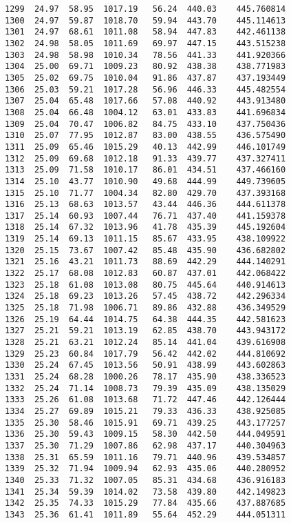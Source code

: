 \documentclass[11pt]{article}
\begin{document}
\begin{tcolorbox}[breakable, size=fbox, boxrule=.5pt, pad at break*=1mm, opacityfill=0]
\begin{Verbatim}[commandchars=\\\{\}]
1299  24.97  58.95  1017.19   56.24  440.03    445.760814
1300  24.97  59.87  1018.70   59.94  443.70    445.114613
1301  24.97  68.61  1011.08   58.94  447.83    442.461138
1302  24.98  58.05  1011.69   69.97  447.15    443.515238
1303  24.98  58.98  1010.34   78.56  441.33    441.920366
1304  25.00  69.71  1009.23   80.92  438.38    438.771983
1305  25.02  69.75  1010.04   91.86  437.87    437.193449
1306  25.03  59.21  1017.28   56.96  446.33    445.482554
1307  25.04  65.48  1017.66   57.08  440.92    443.913480
1308  25.04  66.48  1004.12   63.01  433.83    441.696834
1309  25.04  70.47  1006.82   84.75  433.10    437.750436
1310  25.07  77.95  1012.87   83.00  438.55    436.575490
1311  25.09  65.46  1015.29   40.13  442.99    446.101749
1312  25.09  69.68  1012.18   91.33  439.77    437.327411
1313  25.09  71.58  1010.17   86.01  434.51    437.466160
1314  25.10  43.77  1010.90   49.68  444.99    449.739605
1315  25.10  71.77  1004.34   82.80  429.70    437.393168
1316  25.13  68.63  1013.57   43.44  446.36    444.611378
1317  25.14  60.93  1007.44   76.71  437.40    441.159378
1318  25.14  67.32  1013.96   41.78  435.39    445.192604
1319  25.14  69.13  1011.15   85.67  433.95    438.109922
1320  25.15  73.67  1007.42   85.48  435.90    436.682802
1321  25.16  43.21  1011.73   88.69  442.29    444.140291
1322  25.17  68.08  1012.83   60.87  437.01    442.068422
1323  25.18  61.08  1013.08   80.75  445.64    440.914613
1324  25.18  69.23  1013.26   57.45  438.72    442.296334
1325  25.18  71.98  1006.71   89.86  432.88    436.349529
1326  25.19  64.44  1014.75   64.38  444.35    442.581623
1327  25.21  59.21  1013.19   62.85  438.70    443.943172
1328  25.21  63.21  1012.24   85.14  441.04    439.616908
1329  25.23  60.84  1017.79   56.42  442.02    444.810692
1330  25.24  67.45  1013.56   50.91  438.99    443.602863
1331  25.24  68.28  1000.26   78.17  435.90    438.336523
1332  25.24  71.14  1008.73   79.39  435.09    438.135029
1333  25.26  61.08  1013.68   71.72  447.46    442.126444
1334  25.27  69.89  1015.21   79.33  436.33    438.925085
1335  25.30  58.46  1015.91   69.71  439.25    443.177257
1336  25.30  59.43  1009.15   58.30  442.50    444.049591
1337  25.30  71.29  1007.86   62.98  437.17    440.304963
1338  25.31  65.59  1011.16   79.71  440.96    439.534857
1339  25.32  71.94  1009.94   62.93  435.06    440.280952
1340  25.33  71.32  1007.05   85.31  434.68    436.916183
1341  25.34  59.39  1014.02   73.58  439.80    442.149823
1342  25.35  74.33  1015.29   77.84  435.66    437.887685
1343  25.36  61.41  1011.89   55.64  452.29    444.051311

\end{Verbatim}
\end{tcolorbox}
\end{document}
